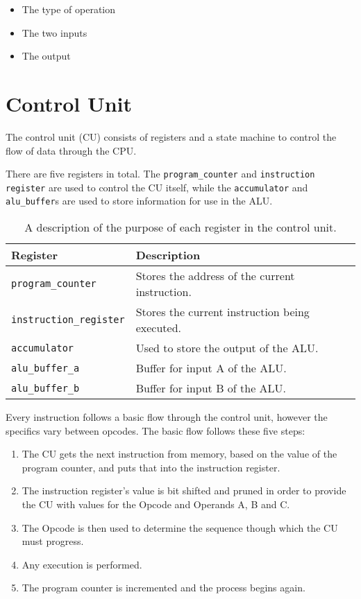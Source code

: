 \documentclass[a4paper]{article}
\begin{document}
\begin{itemize}
    \item The type of operation
    \item The two inputs 
    \item The output
\end{itemize}

\section{Control Unit}

The control unit (CU) consists of registers and a state machine to control the flow of data through the CPU.

There are five registers in total. The \verb|program_counter| and \verb|instruction register| are used to control the CU itself, while the \verb|accumulator| and \verb|alu_buffer|s are used to store information for use in the ALU.

\begin{table}[H]
\centering
\caption{A description of the purpose of each register in the control unit.}
\begin{tabular}{ll}
    Register & Description \\
    \hline
    \verb|program_counter| & Stores the address of the current instruction. \\
    \verb|instruction_register| & Stores the current instruction being executed. \\
    \verb|accumulator| & Used to store the output of the ALU. \\
    \verb|alu_buffer_a| & Buffer for input A of the ALU. \\
    \verb|alu_buffer_b| & Buffer for input B of the ALU. \\
\end{tabular}
\end{table}

Every instruction follows a basic flow through the control unit, however the specifics vary between opcodes. The basic flow follows these five steps:

\begin{enumerate}
    \item The CU gets the next instruction from memory, based on the value of the program counter, and puts that into the instruction register. 
    \item The instruction register's value is bit shifted and pruned in order to provide the CU with values for the Opcode and Operands A, B and C.
    \item The Opcode is then used to determine the sequence though which the CU must progress.
    \item Any execution is performed.
    \item The program counter is incremented and the process begins again.
\end{enumerate}
\end{document}
